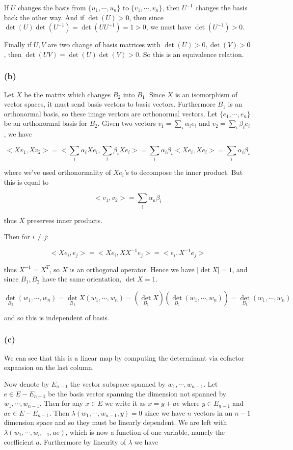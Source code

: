 \documentclass{article}
\begin{document}
If $U$ changes the basis from $\{u_1,\cdots,u_n\}$ to $\{v_1,\cdots,v_n\}$, then $U^{-1}$ changes the basis back the other way. And if $\det(U) > 0$, then since $\det(U) \det(U^{-1}) = \det(UU^{-1}) = 1 > 0$, we must have $\det(U^{-1}) > 0$. 

Finally if $U,V$ are two change of basis matrices with $\det(U)>0, \det(V)>0$, then $\det(UV)=\det(U)\det(V) > 0 $. So this is an equivalence relation. 

\subsubsection{(b)} Let $X$ be the matrix which changes $B_2$ into $B_1$. Since $X$ is an isomorphism of vector spaces, it must send basis vectors to basis vectors. Furthermore $B_1$ is an orthonormal basis, so these image vectors are orthonormal vectors. Let $\{e_1,\cdots,e_n\}$ be an orthonormal basis for $B_2$. Given two vectors $v_1 = \displaystyle\sum_i \alpha_i e_i$ and $v_2 = \displaystyle\sum_i \beta_i e_i$, we have

\[ <Xv_1, Xv_2> = <\sum_i \alpha_i X e_i, \sum_i \beta_i X e_i> = \sum_i \alpha_i \beta_i < Xe_i, X e_i> = \sum_i \alpha_i \beta_i\]

where we've used orthonormality of $Xe_i$'s to decompose the inner product. But this is equal to 

\[ <v_1, v_2> = \sum_i \alpha_a \beta_i \]

thus $X$ preserves inner products. 

Then for $i\neq j$:

\[ <X e_i, e_j> = <Xe_i, XX^{-1} e_j > = <e_i, X^{-1} e_j> \]

thus $X^{-1} = X^T$, so $X$ is an orthogonal operator. Hence we have $|\det X| = 1$, and since $B_1,B_2$ have the same orientation, $\det X = 1$. 

\[\det_{B_2} (w_1,\cdots,w_n) = \det_{B_1} X(w_1,\cdots,w_n) = \left (\det_{B_1} X\right) \left(\det_{B_1} (w_1,\cdots,w_n)\right) = \det_{B_1} (w_1,\cdots,w_n)\]

and so this is independent of basis. 

\subsubsection{(c)}

We can see that this is a linear map by computing the determinant via cofactor expansion on the last column. 

Now denote by $E_{n-1}$ the vector subspace spanned by $w_1,\cdots,w_{n-1}$. Let $e \in E - E_{n-1}$ be the basis vector spanning the dimension not spanned by $w_1,\cdots,w_{n-1}$. Then for any $x \in E$ we write it as $x = y + ae$ where $y \in E_{n-1}$ and $ae \in E - E_{n-1}$. Then $\lambda(w_1,\cdots,w_{n-1},y) = 0$ since we have $n$ vectors in an $n-1$ dimension space and so they must be linearly dependent. We are left with $\lambda(w_1,\cdots,w_{n-1},ae)$, which is now a function of one variable, namely the coefficient $a$. Furthermore by linearity of $\lambda$ we have 
\end{document}
